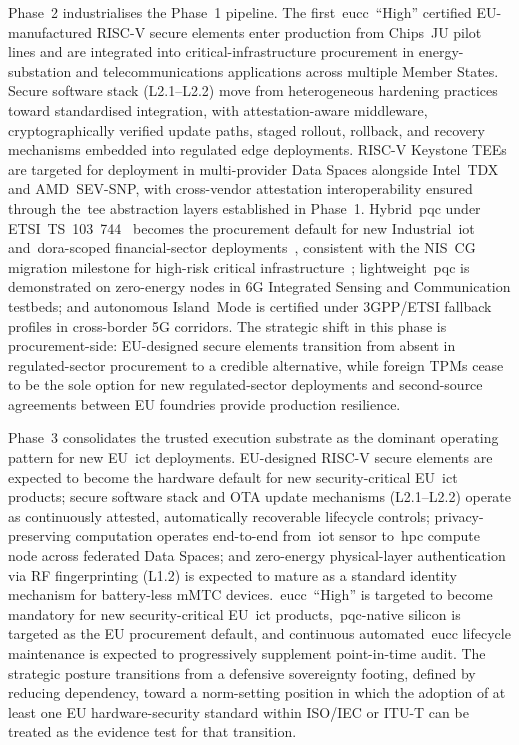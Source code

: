 \documentclass{ieeeaccess}
\begin{document}
Phase~2 industrialises the Phase~1 pipeline. The first~\gls{eucc}~``High'' certified EU-manufactured RISC-V secure elements enter production from Chips~JU pilot lines and are integrated into critical-infrastructure procurement in energy-substation and telecommunications applications across multiple Member States. Secure software stack (L2.1--L2.2) move from heterogeneous hardening practices toward standardised integration, with attestation-aware middleware, cryptographically verified update paths, staged rollout, rollback, and recovery mechanisms embedded into regulated edge deployments. RISC-V Keystone TEEs are targeted for deployment in multi-provider Data Spaces alongside Intel~TDX and AMD~SEV-SNP, with cross-vendor attestation interoperability ensured through the~\gls{tee} abstraction layers established in Phase~1. Hybrid~\gls{pqc} under ETSI~TS~103~744~\cite{etsiqshybrid} becomes the procurement default for new Industrial~\gls{iot} and~\gls{dora}-scoped financial-sector deployments~\cite{eudora}, consistent with the NIS~CG migration milestone for high-risk critical infrastructure~\cite{niscg2025pqc}; lightweight~\gls{pqc} is demonstrated on zero-energy nodes in 6G Integrated Sensing and Communication testbeds; and autonomous Island~Mode is certified under 3GPP/ETSI fallback profiles in cross-border 5G corridors. The strategic shift in this phase is procurement-side: EU-designed secure elements transition from absent in regulated-sector procurement to a credible alternative, while foreign TPMs cease to be the sole option for new regulated-sector deployments and second-source agreements between EU foundries provide production resilience.

Phase~3 consolidates the trusted execution substrate as the dominant operating pattern for new EU~\gls{ict} deployments. EU-designed RISC-V secure elements are expected to become the hardware default for new security-critical EU~\gls{ict} products; secure software stack and OTA update mechanisms (L2.1--L2.2) operate as continuously attested, automatically recoverable lifecycle controls; privacy-preserving computation operates end-to-end from~\gls{iot} sensor to~\gls{hpc} compute node across federated Data Spaces; and zero-energy physical-layer authentication via RF fingerprinting (L1.2) is expected to mature as a standard identity mechanism for battery-less mMTC devices.~\gls{eucc}~``High'' is targeted to become mandatory for new security-critical EU~\gls{ict} products,~\gls{pqc}-native silicon is targeted as the EU procurement default, and continuous automated~\gls{eucc} lifecycle maintenance is expected to progressively supplement point-in-time audit. The strategic posture transitions from a defensive sovereignty footing, defined by reducing dependency, toward a norm-setting position in which the adoption of at least one EU hardware-security standard within ISO/IEC or ITU-T can be treated as the evidence test for that transition.
\end{document}
